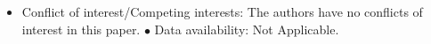 \documentclass[sn-mathphys-num]{sn-jnl}%
\theoremstyle{thmstyleone}%
\theoremstyle{thmstyletwo}%
\theoremstyle{thmstylethree}%
\begin{document}
\begin{itemize}
\item Conflict of interest/Competing interests: The authors have no conflicts of interest in this paper. $\bullet$ Data availability: Not Applicable. 
\end{itemize}


%
%
%
%

%
%



\end{document}
